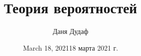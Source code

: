 \documentclass[a4paper, 14pt]{article}
\title{Теория вероятностей}
\author{Даня Дудаф}
\date{March 18, 2021}
\date{18 марта 2021 г.}
\begin{document}
    \newcommand{\bred}[1]{\textcolor{purple}{\textbf{#1}}}
    \newcommand{\diff}{\mathrm{d}}
    \newcommand{\cov}{\mathrm{cov}}

    \maketitle
    \thispagestyle{empty}
    \tableofcontents

    
    
    
    
    
    

    
%    
\end{document}
